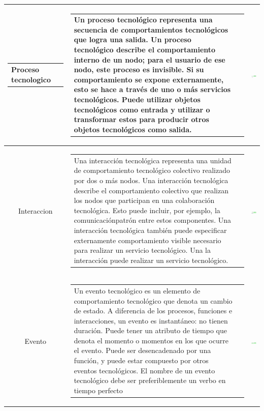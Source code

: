 \begin{longtable}{|c|c|c|}
	\begin{tabular}{p{2cm}p{3cm}}
		Proceso tecnologico
	\end{tabular}
	&
	\begin{tabular}{p{8cm}p{3cm}} 
		Un proceso tecnológico representa una secuencia de comportamientos tecnológicos que logra una salida. Un proceso tecnológico describe el comportamiento interno de un nodo; para el usuario de ese nodo, este proceso es invisible. Si su comportamiento se expone externamente, esto se hace a través de uno o más servicios tecnológicos. Puede utilizar objetos tecnológicos como entrada y utilizar o transformar estos para producir otros objetos tecnológicos como salida.
	\end{tabular}
	& \includegraphics[width=0.2\linewidth, height=0.05\textheight]{imgs/conceptos/tecnologica/procesoTecnologia}
	\\
	\hline
	
	Interaccion 
	&
	\begin{tabular}{p{8cm}p{3cm}} 
		Una interacción tecnológica representa una unidad de comportamiento tecnológico colectivo realizado por dos o más nodos. Una interacción tecnológica describe el comportamiento colectivo que realizan los nodos que participan en una colaboración tecnológica. Esto puede incluir, por ejemplo, la comunicaciónpatrón entre estos componentes. Una interacción tecnológica también puede especificar externamente comportamiento visible necesario para realizar un servicio tecnológico. Una la interacción puede realizar un servicio tecnológico.
	\end{tabular}
	& \includegraphics[width=0.2\linewidth, height=0.05\textheight]{imgs/conceptos/tecnologica/interaccionTecnologia}
	\\
	\hline
	
	Evento 
	&
	\begin{tabular}{p{8cm}p{3cm}} 
		Un evento tecnológico es un elemento de comportamiento tecnológico que denota un cambio de estado. A diferencia de los procesos, funciones e interacciones, un evento es instantáneo: no tienen duración. Puede tener un atributo de tiempo que denota el momento o momentos en los que ocurre el evento. Puede ser desencadenado por una función, y puede estar compuesto por otros eventos tecnológicos. El nombre de un evento tecnológico debe ser preferiblemente un verbo en tiempo perfecto 
	\end{tabular}
	& \includegraphics[width=0.2\linewidth, height=0.05\textheight]{imgs/conceptos/tecnologica/eventoTecnologia}
	\\
	\hline
	

\end{longtable}
